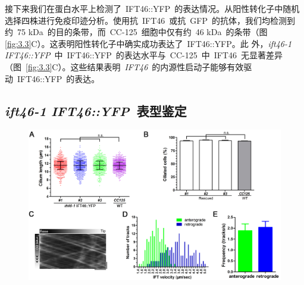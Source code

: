 接下来我们在蛋白水平上检测了\ IFT46::YFP\ 的表达情况。从阳性转化子中随机选择四株进行免疫印迹分析。使用抗\ IFT46\ 或抗\ GFP\ 的抗体，我们均检测到约\ 75 kDa\ 的目的条带，而\ CC-125\ 细胞中仅有约\ 46 kDa\ 的条带（图
\ref{fig:3.3}C）\citep{Hou2007}。这表明阳性转化子中确实成功表达了\ IFT46::YFP。此
外，\textit{ift46-1} \textit{IFT46::YFP}\ 中\ IFT46::YFP\ 的表达水平与\ CC-125\ 中\ IFT46\ 无显著差异（图\ \ref{fig:3.3}C）。这些结果表明\
\textit{IFT46}\ 的内源性启动子能够有效驱动\ IFT46::YFP\ 的表达。
\subsection{\textit{ift46-1} \textit{IFT46::YFP}\ 表型鉴定}
\begin{figure}[htbp!]
\centering
\graphicspath{{figures/}}
\includegraphics[width=\textwidth]{fig3-4.jpg}
{
}
\end{figure}
